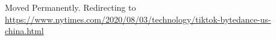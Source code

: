 Moved Permanently. Redirecting to
\url{https://www.nytimes.com/2020/08/03/technology/tiktok-bytedance-us-china.html}

